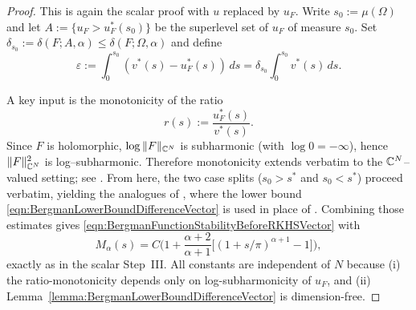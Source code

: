 \documentclass[a4paper,10pt]{amsart}
\begin{document}
\begin{proof}
This is again the scalar proof with $u$ replaced by $u_F$.
Write $s_0:=\mu(\Omega)$ and let $A:=\{u_F>u_F^*(s_0)\}$ be the superlevel set of $u_F$ of measure $s_0$.
Set $\delta_{s_0}:=\delta(F;A,\alpha)\le \delta(F;\Omega,\alpha)$ and define
\[
\varepsilon := \int_0^{s_0}(v^*(s)-u_F^*(s))\,ds
=\delta_{s_0}\int_0^{s_0}v^*(s)\,ds.
\]

A key input is the monotonicity of the ratio
\[
r(s):=\frac{u_F^*(s)}{v^*(s)}.
\]
Since $F$ is holomorphic, $\log\|F\|_{\mathbb{C}^N}$ is subharmonic (with $\log 0=-\infty$), hence
$\|F\|_{\mathbb{C}^N}^2$ is log--subharmonic. Therefore monotonicity extends
verbatim to the $\mathbb{C}^N$--valued setting; see \cite{RamosTilli,GomezKalajMelentijevicRamos2025}.
From here, the two case splits ($s_0>s^*$ and $s_0<s^*$) proceed verbatim, yielding the analogues
of \cite[eq.3.21-eq.3.24]{GomezKalajMelentijevicRamos2025}, where the lower bound
\eqref{eqn:BergmanLowerBoundDifferenceVector} is used in place of \cite[Lemma~3.2]{GomezKalajMelentijevicRamos2025}.
Combining those estimates gives \eqref{eqn:BergmanFunctionStabilityBeforeRKHSVector} with
\[
M_\alpha(s)=C\Big(1+\frac{\alpha+2}{\alpha+1}\big[(1+s/\pi)^{\alpha+1}-1\big]\Big),
\]
exactly as in the scalar Step~III.
All constants are independent of $N$ because (i) the ratio-monotonicity depends only on
log-subharmonicity of $u_F$, and (ii) Lemma~\ref{lemma:BergmanLowerBoundDifferenceVector}
is dimension-free.
\end{proof}

\end{document}
